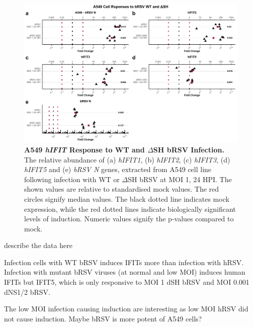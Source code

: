 \begin{figure}
    \centering
    \includegraphics[width=1\linewidth]{06. Chapter 1/Figs/01. Induction/07. a549_brsv_moi1.pdf}
    \caption[A549 \textit{hIFIT} Response to WT and \(\Delta\)SH bRSV Infection.]{\textbf{A549 \textit{hIFIT} Response to WT and \(\Delta\)SH bRSV Infection.} The relative abundance of (a) \textit{hIFIT1}, (b) \textit{hIFIT2}, (c) \textit{hIFIT3}, (d) \textit{hIFIT5} and (e) \textit{bRSV N} genes, extracted from A549 cell line following infection with WT or \(\Delta\)SH bRSV at MOI 1, 24 HPI.  The shown values are relative to standardised mock values. The red circles signify median values. The black dotted line indicates mock expression, while the red dotted lines indicate biologically significant levels of induction. Numeric values signify the p-values compared to mock.}
    \label{Responses of A549 to bRSV WT and dSH.}
\end{figure}

describe the data here

Infection cells with WT bRSV induces IFITs more than infection with hRSV.  Infection with mutant bRSV viruses (at normal and low MOI) induces human IFITs but IFIT5, which is only responsive to MOI 1 dSH bRSV and MOI 0.001 dNS1/2 bRSV.

The low MOI infection causing induction are interesting as low MOI hRSV did not cause induction. Maybe bRSV is more potent of A549 cells?

